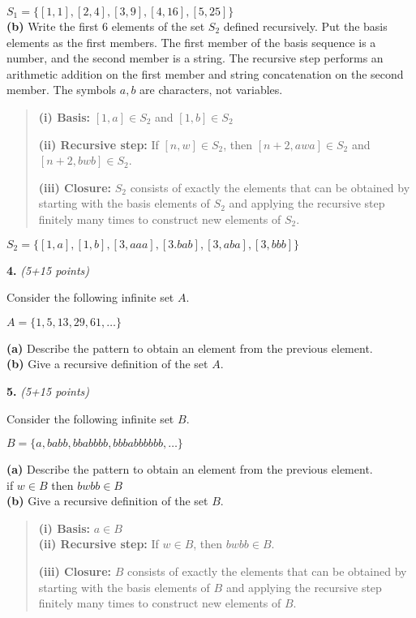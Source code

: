 \documentclass[12pt]{article}
\begin{document}
$S_1= \{[1,1],[2,4],[3,9],[4,16],[5,25]\}$\\


{\bf (b) }
Write the first 6 elements of the set $S_2$ defined recursively.
Put the basis elements as the first members.
The first member of the basis sequence is a number, and the second
member is a string. The recursive step performs an arithmetic addition on the 
first member and string concatenation on the second member.
The symbols $a, b$ are characters, not variables.
\begin{quote}
{\bf (i) Basis:} $[1,a] \in S_2$ and $[1,b] \in S_2$

{\bf (ii) Recursive step:} If $[n,w] \in S_2$, then 
$[n+2, awa] \in S_2$ and $[n+2, bwb] \in S_2$.

{\bf (iii) Closure:} $S_2$ consists of exactly the elements that can be
obtained by starting with the basis elements of $S_2$ and applying the
recursive step finitely many times to construct new elements of $S_2$.
\end{quote}

$S_2=\{[1,a],[1,b],[3,aaa],[3.bab],[3,aba],[3,bbb]\}$

\vspace{0.1in}

{\bf 4.} {\em (5+15 points)}

Consider the following infinite set $A$.

$A = \{ 1, 5, 13, 29, 61, \ldots \} $

{\bf (a) }
Describe the pattern to obtain an element from the previous element.\\

{\bf (b) }
 Give a recursive definition of the set $A$.

\vspace{0.1in}

{\bf 5.} {\em (5+15 points)}

Consider the following infinite set $B$.

$B = \{ a, babb, bbabbbb, bbbabbbbbb, \ldots \} $

{\bf (a) }
Describe the pattern to obtain an element from the previous element.\\
if $w \in B$ then $bwbb \in B$\\

{\bf (b) }
 Give a recursive definition of the set $B$.\\
\begin{quote}
{\bf (i) Basis:} $a \in B$\\
{\bf (ii) Recursive step:} If $w\in B$, then $bwbb \in B $.

{\bf (iii) Closure:} $B$ consists of exactly the elements that can be
obtained by starting with the basis elements of $B$ and applying the
recursive step finitely many times to construct new elements of $B$.
\end{quote}
\end{document}
